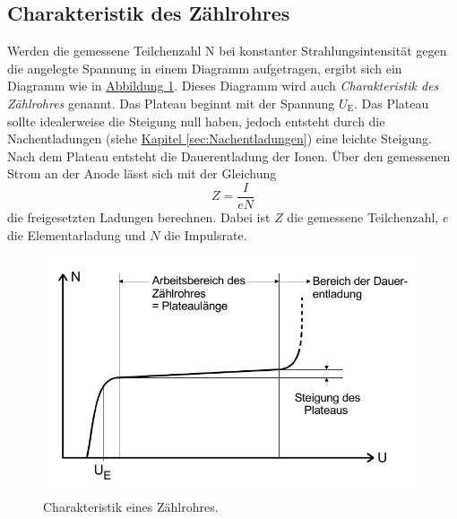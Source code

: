 \subsection{Charakteristik des Zählrohres}
Werden die gemessene Teilchenzahl N bei konstanter Strahlungsintensität gegen die angelegte Spannung in einem
Diagramm aufgetragen, ergibt sich ein Diagramm wie in \hyperref[fig:Diagramm3]{Abbildung \ref{fig:Diagramm3}}.
Dieses Diagramm wird auch \textit{Charakteristik des Zählrohres} genannt.
Das Plateau beginnt mit der Spannung $U_\text{E}$.
Das Plateau sollte idealerweise die Steigung null haben, jedoch entsteht durch die Nachentladungen (siehe \hyperref[sec:Nachentladungen]{Kapitel \ref{sec:Nachentladungen}})
eine leichte Steigung. Nach dem Plateau entsteht die Dauerentladung der Ionen.
Über den gemessenen Strom an der Anode lässt sich mit der Gleichung
\begin{equation}
Z = \frac{I}{e N}
\end{equation}
die freigesetzten Ladungen berechnen. Dabei ist $Z$ die gemessene Teilchenzahl, $e$ die Elementarladung und $N$ die Impulsrate.
\begin{figure}
    \center
    \includegraphics[width=0.7\linewidth]{pictures/Diagramm3.pdf}
    \caption{Charakteristik eines Zählrohres.}\label{fig:Diagramm3}
\end{figure}
